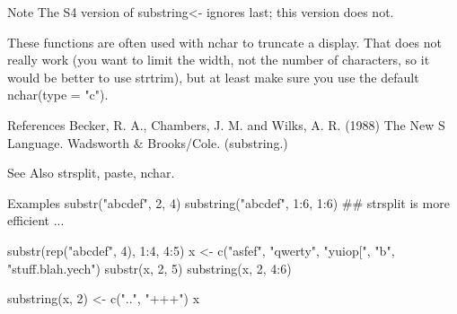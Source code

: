 Note
The S4 version of substring<- ignores last; this version does not. 

These functions are often used with nchar to truncate a display. That does not really work (you want to limit the width, not the number of characters, so it would be better to use strtrim), but at least make sure you use the default nchar(type = "c"). 

References
Becker, R. A., Chambers, J. M. and Wilks, A. R. (1988) The New S Language. Wadsworth & Brooks/Cole. (substring.) 

See Also
strsplit, paste, nchar. 

Examples
substr("abcdef", 2, 4)
substring("abcdef", 1:6, 1:6)
## strsplit is more efficient ...

substr(rep("abcdef", 4), 1:4, 4:5)
x <- c("asfef", "qwerty", "yuiop[", "b", "stuff.blah.yech")
substr(x, 2, 5)
substring(x, 2, 4:6)

substring(x, 2) <- c("..", "+++")
x

